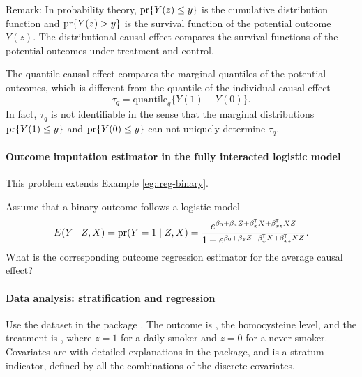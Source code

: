 Remark:
In probability theory, $\textup{pr}\{  Y(z) \leq y \}$ is the cumulative distribution function and $\textup{pr}\{  Y(z) > y \}$ is the survival function of the potential outcome $Y(z)$.
The distributional causal effect compares the survival functions of the potential outcomes under treatment and control. 
 
The  quantile causal effect  compares the marginal quantiles of the potential outcomes, which is different from the quantile of the individual causal effect
$$
\tau_q =  \text{quantile}_q\{ Y(1)  - Y(0)\} .
$$
In fact,  $\tau_q$ is not identifiable in the sense that the marginal distributions $\textup{pr}\{  Y(1) \leq  y  \} $ and $ \textup{pr}\{ Y(0) \leq  y \} $ can not uniquely determine $\tau_q$. 


\paragraph{Outcome imputation estimator in the fully interacted logistic model}\label{hw::outcome-two-logit}

This problem extends Example \ref{eg::reg-binary}. 

Assume that a binary outcome follows a logistic model
$$
E(Y\mid Z, X) = \textup{pr}(Y =1\mid Z, X) = \frac{   e^{\beta_0 + \beta_z Z + \beta_x ^{\mkern-1.5mu\mathsf{T}} X + \beta_{xz}  ^{\mkern-1.5mu\mathsf{T}} X Z }  }
{ 1+ e^{\beta_0 + \beta_z Z + \beta_x ^{\mkern-1.5mu\mathsf{T}} X + \beta_{xz}  ^{\mkern-1.5mu\mathsf{T}} X Z} } .
$$
What is the corresponding outcome regression estimator for the average causal effect?

\paragraph{Data analysis: stratification and regression}\label{hw::stratification-example-rosenbaum}

Use the dataset  in the package . 
The outcome is , the homocysteine level, and the treatment is , where $z=1$ for a daily smoker and $z=0$ for a never smoker. Covariates are  with detailed explanations in the package, and  is a stratum indicator, defined by all the combinations of the discrete covariates.



